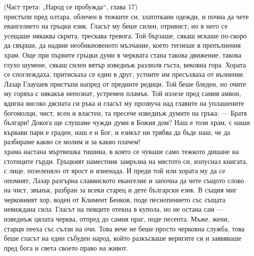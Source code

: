 \documentclass[12pt,a4paper]{article}
\begin{document}
(Част трета: „Народ се пробужда“, глава 17)
\\
 пристъпи пред олтара, облечен в тежките си, златоткани одежди, и почна да чете евангелието на гръцки език. Гласът му беше силен, отривист, но в него се усещаше някаква скрита, трескава тревога. Той бързаше, сякаш искаше по-скоро да свърши, да надвие необикновеното мълчание, което тегнеше в препълнения храм. Още при първите гръцки думи в черквата стана такова движение, такова глухо шумене, сякаш силен вятър изведнъж разлюля гъста, вековна гора. Хората се споглеждаха, притискаха се един в друг, устните им пресъхваха от вълнение.
\\
 Лазар Глаушев пристъпи напред от предните редици. Той беше бледен, но очите му горяха с някакъв непознат, устремен пламък. Той излезе пред самия амвон, вдигна високо дясната си ръка и гласът му прозвуча над главите на уплашените богомолци, чист, ясен и властен, та пресече изведнъж думите на гръка:
— Братя българи! Докога ще слушаме чужди думи в Божия дом? Наш е този храм, с наши кървави пари е граден, наш е и Бог, и езикът ни трябва да бъде наш, че да разбираме какво се молим и за какво плачем!
\\
 храма настана мъртвешка тишина, в която се чуваше само тежкото дишане на стотиците гърди. Гръцкият наместник замръзна на мястото си, изпуснал книгата, с лице, позеленяло от ярост и изненада. И преди той или хората му да се опомнят, Лазар разгърна славянското евангелие и започна да чете същото слово на чист, звънък, разбран за всеки старец и дете български език. В същия миг черковният хор, воден от Климент Бенков, поде песнопението със същата невиждана сила. Гласът на певците отекна в купола, но не остана сам — изведнъж цялата черква, отпред до самия праг, поде песента. Мъже, жени, старци пееха със сълзи на очи. Това вече не беше просто черковна служба, това беше гласът на един събуден народ, който разкъсваше веригите си и заявяваше пред бога и света своето право на живот.
\end{document}
